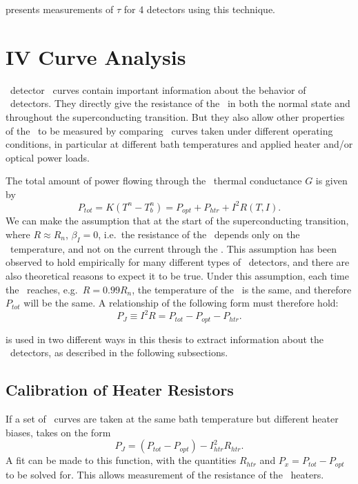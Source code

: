  presents measurements of $\tau$ for 4 detectors using this technique.

\section{\textsc{IV} Curve Analysis}

\TES\ detector \IV\ curves contain important information about the behavior of \TES\ detectors.
They directly give the resistance of the \TES\ in both the normal state and throughout the superconducting transition.
But they also allow other properties of the \TES\ to be measured by comparing \IV\ curves taken under different operating conditions, in particular at different bath temperatures and applied heater and/or optical power loads.

The total amount of power flowing through the \TES\ thermal conductance $G$ is given by
\begin{equation}\label{eqn:ch3-tes-ptot}
P_{tot} = K(T^n - T_b^n) = P_{opt} + P_{htr} + I^2 R(T,I).
\end{equation}
We can make the assumption that at the start of the superconducting transition, where $R \approx R_n$, $\beta_I = 0$, i.e.\ the resistance of the \TES\ depends only on the \TES\ temperature, and not on the current through the \TES.
This assumption has been observed to hold empirically for many different types of \TES\ detectors, and there are also theoretical reasons to expect it to be true\cite{bennett_resistance_2013}.
Under this assumption, each time the \TES\ reaches, e.g.\ $R = 0.99R_n$, the temperature of the \TES\ is the same, and therefore $P_{tot}$ will be the same.
A relationship of the following form must therefore hold:
\begin{equation}\label{eqn:ch3-tes-99Rn}
P_{J} \equiv I^2 R = P_{tot} - P_{opt} - P_{htr}.
\end{equation}

 is used in two different ways in this thesis to extract information about the \TES\ detectors, as described in the following subsections.

\subsection{Calibration of Heater Resistors}

If a set of \IV\ curves are taken at the same bath temperature but different heater biases,  takes on the form
\begin{equation}\label{eqn:ch3-rhtr-fit}
P_J = (P_{tot} - P_{opt}) - I_{htr}^2 R_{htr}.
\end{equation}
A fit can be made to this function, with the quantities $R_{htr}$ and $P_x = P_{tot} - P_{opt}$ to be solved for.
This allows measurement of the resistance of the \TES\ heaters.

